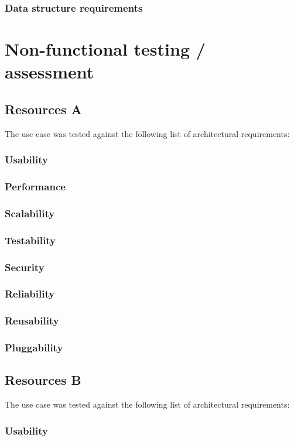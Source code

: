 \documentclass[a4paper]{article}
\begin{document}
\subsubsection {Data structure requirements}

\section {Non-functional testing / assessment}
\subsection {Resources A}
The use case was tested against the following list of architectural requirements:
\subsubsection {Usability}
\subsubsection {Performance}
\subsubsection {Scalability}
\subsubsection {Testability}
\subsubsection {Security}
\subsubsection {Reliability}
\subsubsection {Reusability}
\subsubsection {Pluggability}


\subsection {Resources B}
The use case was tested against the following list of architectural requirements:
\subsubsection {Usability}
\end{document}
